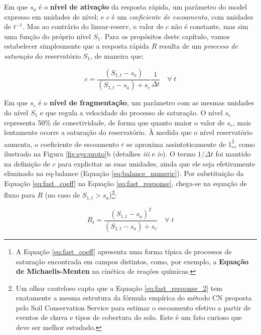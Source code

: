 \documentclass[./main.tex]{subfiles}
\begin{document}
Em que $s_a$ é o \textbf{nível de ativação} da resposta rápida, um parâmetro do \gls{model} expresso em unidades de nível; e  $c$ é um \textit{coeficiente de escoamento}, com unidades de $t^{-1}$. Mas ao contrário do \gls{linear-reserv}, o valor de $c$ não é constante, mas sim uma função do próprio nível $S_1$. Para os propósitos deste capítulo, vamos estabelecer simplesmente que a resposta rápida $R$ resulta de um \textit{processo de saturação} do reservatório $S_1$, de maneira que:
\begin{linenomath*}
\begin{equation} 
	\label{eq:fast_coeff}
	c = \frac{(S_{1,t} - s_a)}{(S_{1,t} - s_a) + s_c} \frac{1}{\Delta t} \quad \forall\;t
\end{equation}
\end{linenomath*}
Em que $s_c$ é o \textbf{nível de fragmentação}, um parâmetro com as mesmas unidades do nível $S_1$ e que regula a velocidade do processo de saturação. O nível $s_c$ representa 50\% de conectividade, de forma que quanto maior o valor de $s_c$, mais lentamente ocorre a saturação do reservatório. À medida que o nível reservatório aumenta, o coeficiente de escoamento $c$ se aproxima assintoticamente de 1\footnote{A Equação \eqref{eq:fast_coeff} apresenta uma forma típica de processos de saturação encontrada em campos distintos, como, por exemplo, a \textbf{Equação de Michaelis-Menten} na cinética de reações químicas.}, como ilustrado na Figura \ref{fig:sys:proto}b (detalhes \textrm{\textit{iii}} e \textrm{\textit{iv}}). O termo $1/ \Delta t$ foi mantido na definição de $c$ para explicitar as suas unidades, ainda que ele seja efetivamente eliminado na \gls{eq-balance} (Equação \eqref{eq:balance_numeric}). Por substituição da Equação \eqref{eq:fast_coeff} na Equação \eqref{eq:fast_response}, chega-se na equação de fluxo para $R$ (no caso de $S_{1,t} > s_a$)\footnote{Um olhar cauteloso capta que a Equação \eqref{eq:fast_response_2} tem exatamente a mesma estrutura da fórmula empírica do método CN proposta pelo Soil Conservation Service para estimar o escoamento efetivo a partir de eventos de chuva e tipos de cobertura do solo. Este é um fato curioso que deve ser melhor estudado.}:
\begin{linenomath*}
\begin{equation} 
\label{eq:fast_response_2}
 R_{t} = \frac{(S_{1,t} - s_a)^2}{(S_{1,t} - s_a) + s_c} \quad \forall\;t
\end{equation}
\end{linenomath*}
\end{document}
